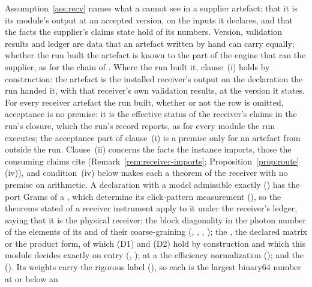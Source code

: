 Assumption~\ref{ass:recv} names what a  cannot see
in a supplier artefact: that it is its module's output at an accepted
version, on the inputs it declares, and that the facts the supplier's claims
state hold of its numbers. Version, validation results and ledger are data
that an artefact written by hand can carry equally; whether the run built
the artefact is known to the part of the engine that ran the supplier, as
for the chain of . Where the
run built it, clause~(i) holds by construction: the artefact is the
installed receiver's output on the declaration the run handed it, with that
receiver's own validation results, at the version it states. For every
receiver artefact the run built, whether or not the row is omitted,
acceptance is no premise: it is the effective status of the receiver's
claims in the run's closure, which the run's record reports, as for every
module the run executes; the acceptance part of clause~(i) is a premise only
for an artefact from outside the run. Clause~(ii) concerns the facts the instance imports, those the
consuming claims cite (Remark~\ref{rem:receiver-imports};
Proposition~\ref{prop:route}\,(iv)), and condition~(iv) below makes each a
theorem of the receiver with no premise on arithmetic. A declaration with a
model admissible exactly () has
the port Grams of a , which determine its
click-pattern measurement (),
so the theorems stated of a receiver instrument apply to it under the
receiver's ledger,  saying that it is the physical
receiver: the block diagonality in the photon number of the
elements of its  and of their coarse-graining
(, ,
, ); the
, the declared matrix or the product form, of which
(D1) and (D2) hold by construction and which this module decides exactly on
entry (,
); at a
 the efficiency normalization
(); and
the  (). Its weights carry
the rigorous label (), so each
 is the largest binary64 number at or below an
